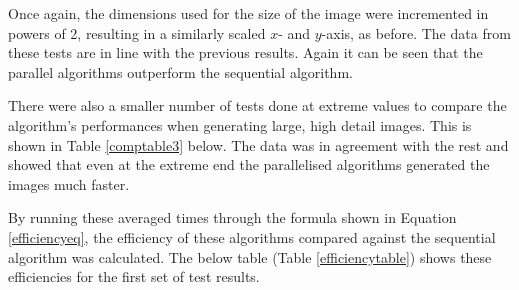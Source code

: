 \documentclass[12pt,journal,transmag]{IEEEtran}
\begin{document}
	Once again, the dimensions used for the size of the image were incremented in powers of 2, resulting in a similarly scaled $x$- and $y$-axis, as before. The data from these tests are in line with the previous results. Again it can be seen that the parallel algorithms outperform the sequential algorithm.
	
	There were also a smaller number of tests done at extreme values to compare the algorithm's performances when generating large, high detail images. This is shown in Table \ref{comptable3} below. The data was in agreement with the rest and showed that even at the extreme end the parallelised algorithms generated the images much faster.
	
	\begin{table}[!h]
		\caption{Extreme Spp and Image Size Performance Comparison}
		\label{comptable3}
		\centering
	\end{table}
	
	By running these averaged times through the formula shown in Equation \ref{efficiencyeq}, the efficiency of these algorithms compared against the sequential algorithm was calculated. The below table (Table \ref{efficiencytable}) shows these efficiencies for the first set of test results.

	\begin{table}[!h]
		\caption{Algorithmic Efficiency Comparison}
		\label{efficiencytable}
		\centering
	\end{table}
\end{document}
